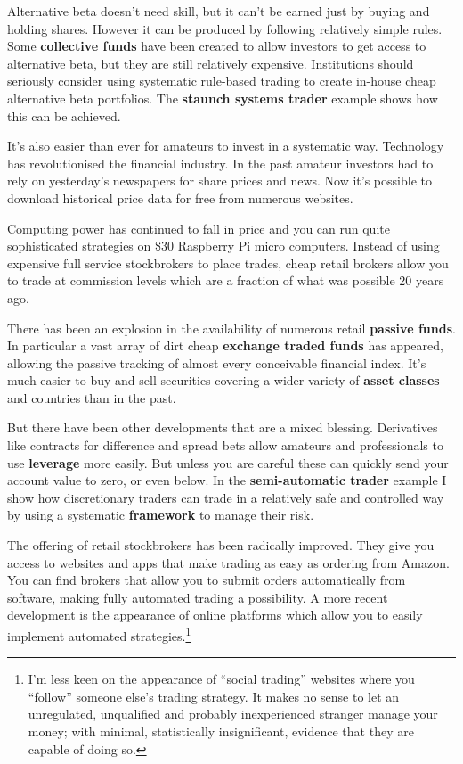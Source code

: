 Alternative beta doesn't need skill, but it can't be earned just by buying and holding shares. However it can be produced by following relatively simple rules. Some \textbf{collective funds} have been created to allow investors to get access to alternative beta, but they are still relatively expensive. Institutions should seriously consider using systematic rule-based trading to create in-house cheap alternative beta portfolios. The \textbf{staunch systems trader} example shows how this can be achieved.

It's also easier than ever for amateurs to invest in a systematic way. Technology has revolutionised the financial industry. In the past amateur investors had to rely on yesterday's newspapers for share prices and news. Now it's possible to download historical price data for free from numerous websites.

Computing power has continued to fall in price and you can run quite sophisticated strategies on \$30 Raspberry Pi micro computers. Instead of using expensive full service stockbrokers to place trades, cheap retail brokers allow you to trade at commission levels which are a fraction of what was possible 20 years ago.

There has been an explosion in the availability of numerous retail \textbf{passive funds}. In particular a vast array of dirt cheap \textbf{exchange traded funds} has appeared, allowing the passive tracking of almost every conceivable financial index. It's much easier to buy and sell securities covering a wider variety of \textbf{asset classes} and countries than in the past.

But there have been other developments that are a mixed blessing. Derivatives like contracts for difference and spread bets allow amateurs and professionals to use \textbf{leverage} more easily. But unless you are careful these can quickly send your account value to zero, or even below. In the \textbf{semi-automatic trader} example I show how discretionary traders can trade in a relatively safe and controlled way by using a systematic \textbf{framework} to manage their risk.

The offering of retail stockbrokers has been radically improved. They give you access to websites and apps that make trading as easy as ordering from Amazon. You can find brokers that allow you to submit orders automatically from software, making fully automated trading a possibility. A more recent development is the appearance of online platforms which allow you to easily implement automated strategies.\footnote{I'm less keen on the appearance of ``social trading'' websites where you ``follow'' someone else's trading strategy. It makes no sense to let an unregulated, unqualified and probably inexperienced stranger manage your money; with minimal, statistically insignificant, evidence that they are capable of doing so.}

